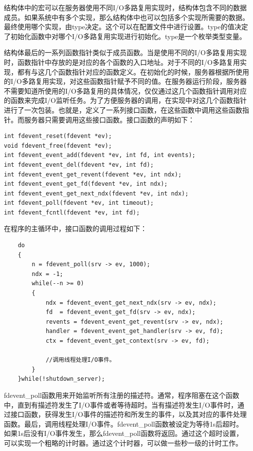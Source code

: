 \documentclass[12pt, twoside, a4paper, xetex]{report}
\begin{document}
	结构体中的宏可以在服务器使用不同I/O多路复用实现时，结构体包含不同的数据成员。如果系统中有多个实现，那么结构体中也可以包括多个实现所需要的数据。最终使用哪个实现，由type决定。这个可以在配置文件中进行设置。type的值决定了初始化函数中对哪个I/O多路复用实现进行初始化。type是一个枚举类型变量。
	
	结构体最后的一系列函数指针类似于成员函数。当是使用不同的I/O多路复用实现时，函数指针中存放的是对应的各个函数的入口地址。对于不同的I/O多路复用实现，都有与这几个函数指针对应的函数定义。在初始化的时候，服务器根据所使用的I/O多路复用实现，对这些函数指针赋予不同的值。在服务器运行阶段，服务器不需要知道所使用的I/O多路复用的具体情况，仅仅通过这几个函数指针调用对应的函数来完成I/O监听任务。为了方便服务器的调用，在实现中对这几个函数指针进行了一次包装。也就是，定义了一系列接口函数，在这些函数中调用这些函数指针。而服务器只需要调用这些接口函数。接口函数的声明如下：
	
\begin{verbatim}
int fdevent_reset(fdevent *ev);
void fdevent_free(fdevent *ev);
int fdevent_event_add(fdevent *ev, int fd, int events);
int fdevent_event_del(fdevent *ev, int fd);
int fdevent_event_get_revent(fdevent *ev, int ndx);
int fdevent_event_get_fd(fdevent *ev, int ndx);
int fdevent_event_get_next_ndx(fdevent *ev, int ndx);
int fdevent_poll(fdevent *ev, int timeout);
int fdevent_fcntl(fdevent *ev, int fd);
\end{verbatim}

	在程序的主循环中，接口函数的调用过程如下：

\begin{verbatim}
	do
	{
		n = fdevent_poll(srv -> ev, 1000);
		ndx = -1;
		while(--n >= 0)
		{
			ndx = fdevent_event_get_next_ndx(srv -> ev, ndx);
			fd  = fdevent_event_get_fd(srv -> ev, ndx);
			revents = fdevent_event_get_revent(srv -> ev, ndx);
			handler = fdevent_event_get_handler(srv -> ev, fd);
			ctx = fdevent_event_get_context(srv -> ev, fd);			
			
			//调用线程处理I/O事件。
		}
	}while(!shutdown_server);
\end{verbatim}	
	
	fdevent\_poll函数用来开始监听所有注册的描述符。通常，程序阻塞在这个函数中，直到有描述符发生了I/O事件或者等待超时。当有描述符发生I/O事件时，通过接口函数，获得发生I/O事件的描述符和所发生的事件，以及其对应的事件处理函数。最后，调用线程处理I/O事件。fdevent\_poll函数被设定为等待1s后超时。如果1s后没有I/O事件发生，那么fdevent\_poll函数将返回。通过这个超时设置，可以实现一个粗略的计时器。通过这个计时器，可以做一些秒一级的计时工作。
	
\end{document}
